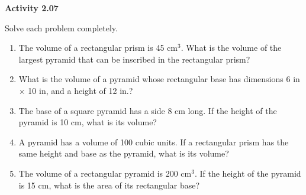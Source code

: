 \vspace{0.3ex}
\noindent\textbf{Activity 2.07}

\vspace{0.2ex}

Solve each problem completely.
\begin{enumerate}[noitemsep, label = \color{blue}\arabic*. ]
    \item The volume of a rectangular prism is 45 cm\(^{3}\). What is the volume of the largest pyramid that can be inscribed in the rectangular prism?
    \item What is the volume of a pyramid whose rectangular base has dimensions 6 in \(\times\) 10 in, and a height of 12 in.?
    \item The base of a square pyramid has a side 8 cm long. If the height of the pyramid is 10 cm, what is its volume?
    \item A pyramid has a volume of 100 cubic units. If a rectangular prism has the same height and base as the pyramid, what is its volume?
    \item The volume of a rectangular pyramid is 200 cm\(^{3}\). If the height of the pyramid is 15 cm, what is the area of its rectangular base?

\end{enumerate}
